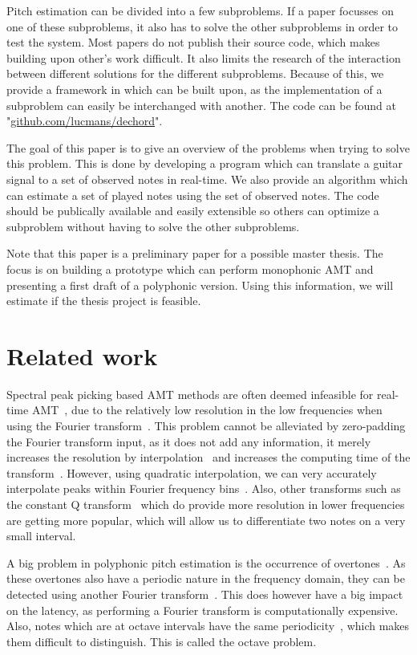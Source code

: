 \documentclass[10pt,twocolumn]{article}
\begin{document}
Pitch estimation can be divided into a few subproblems. If a paper focusses on one of these subproblems, it also has to solve the other subproblems in order to test the system. Most papers do not publish their source code, which makes building upon other's work difficult. It also limits the research of the interaction between different solutions for the different subproblems. Because of this, we provide a framework in which can be built upon, as the implementation of a subproblem can easily be interchanged with another. The code can be found at "\url{github.com/lucmans/dechord}".

The goal of this paper is to give an overview of the problems when trying to solve this problem. This is done by developing a program which can translate a guitar signal to a set of observed notes in real-time. We also provide an algorithm which can estimate a set of played notes using the set of observed notes. The code should be publically available and easily extensible so others can optimize a subproblem without having to solve the other subproblems.

Note that this paper is a preliminary paper for a possible master thesis. The focus is on building a prototype which can perform monophonic AMT and presenting a first draft of a polyphonic version. Using this information, we will estimate if the thesis project is feasible.


\section{Related work}
Spectral peak picking based AMT methods are often deemed infeasible for real-time AMT~\cite{hater}, due to the relatively low resolution in the low frequencies when using the Fourier transform~\cite{theoretisch}. This problem cannot be alleviated by zero-padding the Fourier transform input, as it does not add any information, it merely increases the resolution by interpolation~\cite{infomax}\cite{infomax2} and increases the computing time of the transform~\cite{boek}. However, using quadratic interpolation, we can very accurately interpolate peaks within Fourier frequency bins~\cite{interpol}. Also, other transforms such as the constant Q transform~\cite{cqt} which do provide more resolution in lower frequencies are getting more popular, which will allow us to differentiate two notes on a very small interval.

A big problem in polyphonic pitch estimation is the occurrence of overtones~\cite{oud}. As these overtones also have a periodic nature in the frequency domain, they can be detected using another Fourier transform~\cite{double}. This does however have a big impact on the latency, as performing a Fourier transform is computationally expensive. Also, notes which are at octave intervals have the same periodicity~\cite{octave}, which makes them difficult to distinguish. This is called the octave problem.
\end{document}

